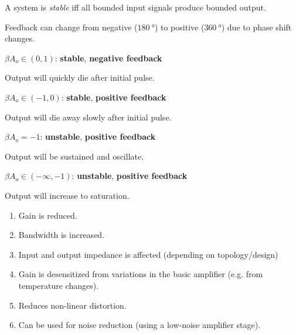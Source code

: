 \begin{multicols}{2}

    \begin{CheatsheetEntryFrame}

         

        A system is \emph{stable} iff all bounded input signals produce bounded output.

        Feedback can change from negative ($\qty{180}{\degree}$) \linebreak to positive ($\qty{360}{\degree}$) due to phase shift changes.

        $\beta A_o \in (0, 1)$: {\color{mygreen} \textbf{stable}}, {\color{myblue} \textbf{negative feedback}}
        \begin{pindent}
            Output will quickly die after initial pulse.
        \end{pindent}
        $\beta A_o \in (-1, 0)$: {\color{mygreen} \textbf{stable}}, {\color{mypurple} \textbf{positive feedback}}
        \begin{pindent}
            Output will die away slowly after initial pulse.
        \end{pindent}
        $\beta A_o = -1$: {\color{myred} \textbf{unstable}}, {\color{mypurple} \textbf{positive feedback}}
        \begin{pindent}
            Output will be sustained and oscillate.
        \end{pindent}
        $\beta A_o \in (-\infty, -1)$: {\color{myred} \textbf{unstable}}, {\color{mypurple} \textbf{positive feedback}}
        \begin{pindent}
            Output will increase to saturation.
        \end{pindent}

    \end{CheatsheetEntryFrame}

    \begin{CheatsheetEntryFrame}

        \begin{enumerate}
            \item Gain is reduced.
            \item Bandwidth is increased.
            \item Input and output impedance is affected (depending on topology/design)
            \item Gain is desensitized from variations in the basic amplifier (e.g. from temperature changes).
            \item Reduces non-linear distortion.
            \item Can be used for noise reduction (using a low-noise amplifier stage).
        \end{enumerate}

    \end{CheatsheetEntryFrame}

\end{multicols}

